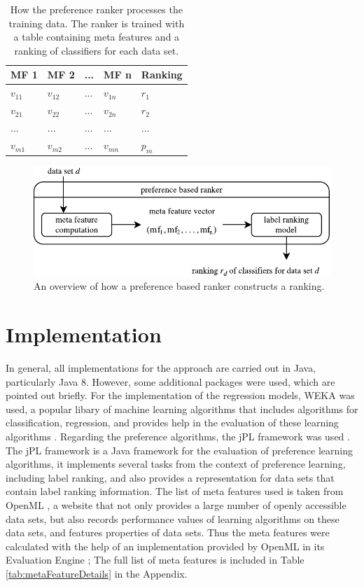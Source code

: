 \begin{table}[h]
\centering
	\begin{tabularx}{\textwidth}{X | X | X | X | X}
		MF 1				& MF 2				& ... 	& MF n				& Ranking 	\\ \hline
		$v_{11}$			& $v_{12}$			& ...	& $v_{1n}$			& $r_1$		\\ 
		$v_{21}$			& $v_{22}$			& ...	& $v_{2n}$			& $r_2$		\\
		...				& ...				& ...	& ...				& ...		\\
		$v_{m1}$			& $v_{m2}$			& ... 	& $v_{mn}$			& $p_m$		 
	\end{tabularx}
	\label{tab:preferenceTable}
	\caption{How the preference ranker processes the training data. The ranker is trained with a table containing meta features and a ranking of classifiers for each data set.}
\end{table}

\begin{figure}
\centering
\includegraphics[scale=1]{gfx/label_ranking_model.pdf}
\caption{An overview of how a preference based ranker constructs a ranking.}
\label{fig:preference_ranker_model}
\end{figure}

\section{Implementation}
In general, all implementations for the approach are carried out in Java, particularly Java 8. However, some additional packages were used, which are pointed out briefly. For the implementation of the regression models, WEKA was used, a popular libary of machine learning algorithms that includes algorithms for classification, regression, and provides help in the evaluation of these learning algorithms \cite{hall2009weka}. Regarding the preference algorithms, the jPL framework was used \cite{intelligent2017jpl}. The jPL framework is a Java framework for the evaluation of preference learning algorithms, it implements several tasks from the context of preference learning, including label ranking, and also provides a representation for data sets that contain label ranking information. The list of meta features used is taken from OpenML \cite{OpenML2013}, a website that not only provides a large number of openly accessible data sets, but also records performance values of learning algorithms on these data sets, and features properties of data sets. Thus the meta features were calculated with the help of an implementation provided by OpenML in its Evaluation Engine \cite{openMLEvaluationEngine}; The full list of meta features is included in Table \ref{tab:metaFeatureDetails} in the Appendix.
